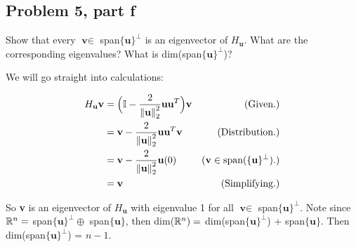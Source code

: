 \newpage
\subsection{Problem 5, part f}
Show that every $\textbf{v} \in $ span$\{ \textbf{u}\}^\perp$ is an eigenvector of $H_\textbf{u}$. What are the corresponding eigenvalues? What is dim(span$\{\textbf{u}\}^\perp$)?
\partbreak
\begin{solution}

    We will go straight into calculations:

    \alignbreak
    \begin{align*}
        H_\textbf{u}\textbf{v} &= \Big( \mathbb{I} - \frac{2}{\norm{\textbf{u}}_2^2} \textbf{u}\textbf{u}^T\Big)\textbf{v} &\text{(Given.)}\\
        &= \textbf{v} - \frac{2}{\norm{\textbf{u}}_2^2} \textbf{u}\textbf{u}^T\textbf{v} &\text{(Distribution.)}\\
        &= \textbf{v} - \frac{2}{\norm{\textbf{u}}_2^2} \textbf{u}(0) &(\textbf{v} \in \text{span} (\{ \textbf{u}\}^\perp).)\\
        &= \textbf{v} &\text{(Simplifying.)}
    \end{align*}
    \alignbreak

    So \textbf{v} is an eigenvector of $H_\textbf{u}$ with eigenvalue 1 for all $\textbf{v} \in $ span$\{ \textbf{u}\}^\perp$. Note since $\mathbb{R}^n =$ span$\{ \textbf{u}\}^\perp \oplus $ span$\{ \textbf{u}\}$, then dim($\mathbb{R}^n) =$ dim(span$\{ \textbf{u}\}^\perp$) + span$\{ \textbf{u}\}$. Then dim(span$\{ \textbf{u}\}^\perp$) = $n - 1$.
\end{solution}

\newpage
